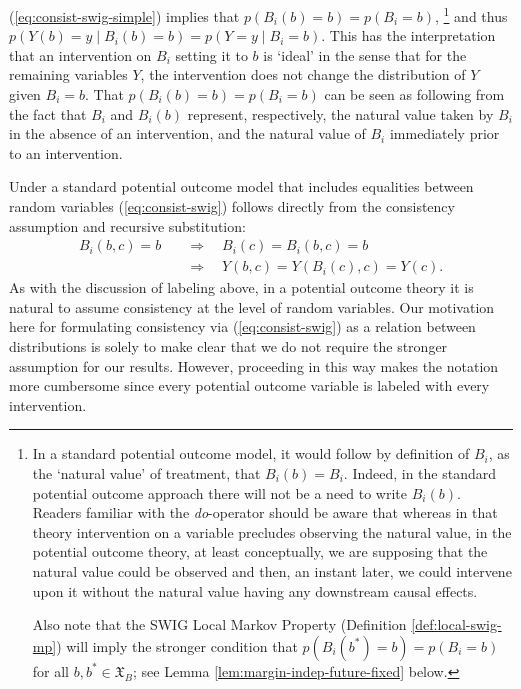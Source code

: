 \documentclass[11pt]{article}
\begin{document}
(\ref{eq:consist-swig-simple}) implies that $p(B_i(b)\!=\!b) = p(B_i\!=\!b)$,%
\footnote{In a standard potential outcome model, it would follow by definition of $B_i$, as the `natural value' of treatment, that $B_i(b)=B_i$.
Indeed, in the standard potential outcome approach there will not be a need to write $B_i(b)$. Readers familiar with the {\it do}-operator \citep{pearl95causal} should be aware that whereas in that theory intervention on a variable precludes observing the natural value, in the potential outcome theory, at least conceptually, we are supposing that the natural value could be observed and then, an instant later, we could intervene upon it without the natural value having any downstream causal effects.
\label{foot:natural-intervention}\par
Also note that the SWIG Local Markov Property (Definition \protect\ref{def:local-swig-mp}) will imply the stronger condition that $p(B_i(b^*)\!=\!b) = p(B_i\!=\!b)$ for all $b,b^* \in \mathfrak{X}_B$;
see Lemma \protect\ref{lem:margin-indep-future-fixed} below.
}
  and thus $p(Y(b)\!=\!y \mid B_i(b)\!=\!b) = p(Y\!=\!y \mid B_i\!=\!b)$. 
This has the interpretation that an intervention on $B_i$ setting it to $b$ is `ideal' in the sense that for the remaining variables $Y$, the intervention does not change the distribution of $Y$ given $B_i=b$. 
That $p(B_i(b)=b) = p(B_i=b)$ can be seen as following from the fact that $B_i$ and $B_i(b)$ represent, respectively, the natural value taken by $B_i$ in the absence of an intervention, and the natural value of $B_i$ immediately prior to an intervention. 

Under a standard potential outcome model 
that includes equalities between random variables 
(\ref{eq:consist-swig}) follows directly from the consistency assumption and recursive substitution:
\begin{align*}
B_i({ b},{ c}) \!=\! { b} \quad &\Rightarrow \quad B_i({ c}) \!=\! B_i({ b},{ c}) \!=\! { b}\\
\quad &\Rightarrow \quad Y({ b},{ c}) = Y(B_i({ c}),{ c}) = Y({ c}).
\end{align*} 
As with the discussion of labeling above, in a potential outcome theory it is natural to assume consistency at the level of random variables. Our motivation here for formulating consistency  via (\ref{eq:consist-swig}) as a relation between distributions is solely to make clear that we do not require the stronger assumption for our results.
However, proceeding in this way makes the notation more cumbersome since every potential outcome variable is labeled with every intervention.
\end{document}
